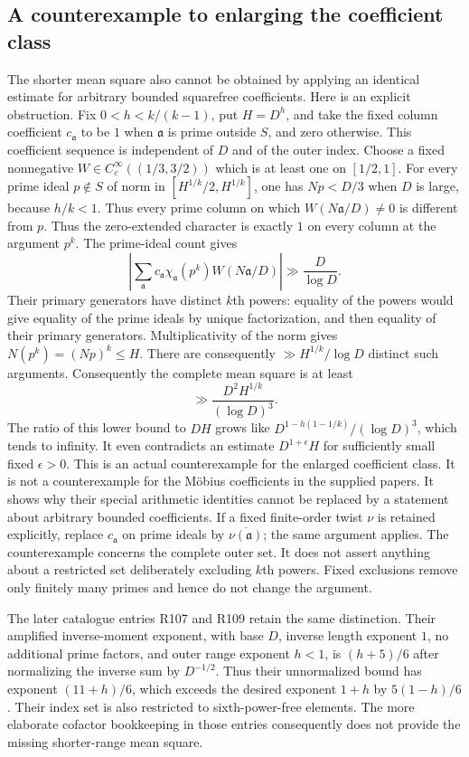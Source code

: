 \subsection{A counterexample to enlarging the coefficient class}

The shorter mean square also cannot be obtained by applying an
identical estimate for arbitrary bounded squarefree coefficients.
Here is an explicit obstruction. Fix $0<h<k/(k-1)$, put
$H=D^h$, and take the fixed column coefficient $c_{\mathfrak a}$
to be $1$ when $\mathfrak a$ is prime outside $S$, and
zero otherwise. This coefficient sequence is independent
of $D$ and of the outer index. Choose a fixed nonnegative
$W\in C_c^\infty((1/3,3/2))$ which is at least one
on $[1/2,1]$. For every prime ideal $p\notin S$ of norm in
$[H^{1/k}/2,H^{1/k}]$, one has $Np<D/3$ when $D$ is
large, because $h/k<1$. Thus every prime column on which
$W(N\mathfrak a/D)\ne0$ is different from $p$. Thus the zero-extended character
is exactly $1$ on every column at the argument $p^k$.
The prime-ideal count gives
\[
 \left|\sum_{\mathfrak a}\!c_{\mathfrak a}
      \chi_{\mathfrak a}(p^k)W(N\mathfrak a/D)\right|
       \gg\frac D{\log D}.
\]
Their primary generators have distinct $k$th powers:
equality of the powers would give equality of the prime
ideals by unique factorization, and then equality of their
primary generators. Multiplicativity of the norm gives
$N(p^k)=(Np)^k\le H$. There are consequently
$\gg H^{1/k}/\log D$ distinct such arguments.
Consequently the complete mean square is at least
\[
       \gg\frac{D^2H^{1/k}}{(\log D)^3}.
\]
The ratio of this lower bound to $DH$ grows like
$D^{1-h(1-1/k)}/(\log D)^3$, which tends to infinity.
It even contradicts an estimate $D^{1+\epsilon}H$ for
sufficiently small fixed $\epsilon>0$.
This is an actual counterexample for the enlarged
coefficient class. It is not a counterexample for the
M\"obius coefficients in the supplied papers. It shows
why their special arithmetic identities cannot be replaced
by a statement about arbitrary bounded coefficients.
If a fixed finite-order twist $\nu$ is retained explicitly,
replace $c_{\mathfrak a}$ on prime ideals by
$\overline{\nu(\mathfrak a)}$; the same argument applies.
The counterexample concerns the complete outer set. It does
not assert anything about a restricted set deliberately
excluding $k$th powers. Fixed exclusions remove only
finitely many primes and hence do not change the argument.

The later catalogue entries R107 and R109 retain the same distinction.
Their amplified inverse-moment exponent, with base $D$, inverse
length exponent $1$, no additional prime factors, and outer
range exponent $h<1$, is $(h+5)/6$ after normalizing the inverse
sum by $D^{-1/2}$. Thus their unnormalized bound has exponent
$(11+h)/6$, which exceeds the desired exponent $1+h$ by
$5(1-h)/6$. Their index set is also restricted to
sixth-power-free elements. The more elaborate cofactor bookkeeping
in those entries consequently does not provide the missing
shorter-range mean square.\cite{qrh-catalogue}


